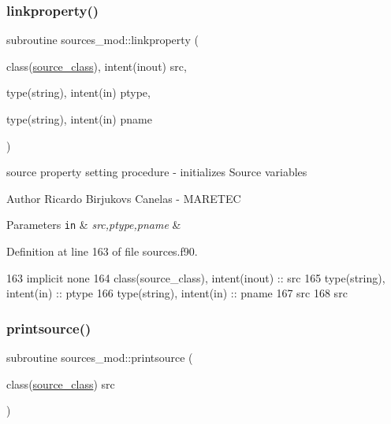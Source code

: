 \subsubsection{\texorpdfstring{linkproperty()}{linkproperty()}}
{\footnotesize\ttfamily subroutine sources\+\_\+mod\+::linkproperty (\begin{DoxyParamCaption}\item[{class(\mbox{\hyperlink{structsources__mod_1_1source__class}{source\+\_\+class}}), intent(inout)}]{src,  }\item[{type(string), intent(in)}]{ptype,  }\item[{type(string), intent(in)}]{pname }\end{DoxyParamCaption})\hspace{0.3cm}{\ttfamily [private]}}



source property setting procedure -\/ initializes Source variables 

\begin{DoxyAuthor}{Author}
Ricardo Birjukovs Canelas -\/ M\+A\+R\+E\+T\+EC 
\end{DoxyAuthor}

\begin{DoxyParams}[1]{Parameters}
\mbox{\tt in}  & {\em src,ptype,pname} & \\
\hline
\end{DoxyParams}


Definition at line 163 of file sources.\+f90.


\begin{DoxyCode}
163     \textcolor{keywordtype}{implicit none}
164     \textcolor{keywordtype}{class}(source\_class), \textcolor{keywordtype}{intent(inout)} :: src
165     \textcolor{keywordtype}{type}(string), \textcolor{keywordtype}{intent(in)} :: ptype
166     \textcolor{keywordtype}{type}(string), \textcolor{keywordtype}{intent(in)} :: pname
167     src%
168     src%
\end{DoxyCode}
\mbox{\label{namespacesources__mod_a641fe9ecc295e486a714c1aaa133d991}} 
\subsubsection{\texorpdfstring{printsource()}{printsource()}}
{\footnotesize\ttfamily subroutine sources\+\_\+mod\+::printsource (\begin{DoxyParamCaption}\item[{class(\mbox{\hyperlink{structsources__mod_1_1source__class}{source\+\_\+class}})}]{src }\end{DoxyParamCaption})\hspace{0.3cm}{\ttfamily [private]}}



